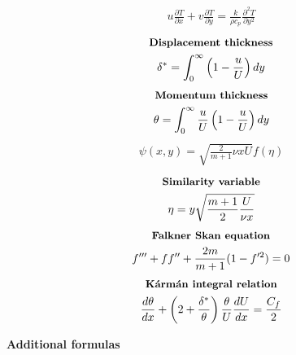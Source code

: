 \documentclass[10pt, a4paper]{article}
\newcommand{\derivative}[2]{\frac{\partial #1}{\partial #2}}
\begin{document}
\begin{multicols*}{2}
\begin{gather*}
        u\derivative{ T}{x} + v \derivative{ T}{y} =
        \frac{k}{\rho c_p} \derivative{^2 T}{y^2}
    \end{gather*}
    \begin{gather*}
        \textbf{\small Displacement thickness} \\
        \delta^* = \int_0^\infty\left( 1 - \frac{u}{U} \right)dy
    \end{gather*}
    \begin{gather*}
        \textbf{\small Momentum thickness} \\
        \theta = \int_0^\infty \frac{u}{U}\left( 1 - \frac{u}{U} \right)dy
    \end{gather*}
    \begin{gather*}
        \psi(x,y) = \sqrt{\frac{2}{m+1}\nu x U}f(\eta)
    \end{gather*}
    \begin{gather*}
        \textbf{\small Similarity variable} \\
        \eta = y \sqrt{\frac{m+1}{2}\frac{U}{\nu x}}
    \end{gather*}
    \begin{gather*}
        \textbf{\small Falkner Skan equation} \\
        f''' + ff'' + \frac{2m}{m+1}(1-f'^2)=0
    \end{gather*}
    \begin{gather*}
        \textbf{\small Kármán integral relation} \\
        \frac{d\theta}{dx} + \left( 2 + \frac{\delta^*}{\theta} \right)\frac{\theta}{U}\frac{dU}{dx} =
        \frac{C_f}{2}
    \end{gather*}
\end{multicols*}
\begin{center}
    \Large
    \textbf{Additional formulas}
    \vspace{0.5cm}
\end{center}
\end{document}

